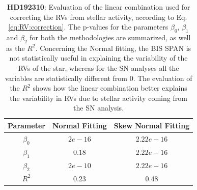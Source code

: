 \documentclass[11pt, oneside]{article}
\begin{document}
%
\begin{table}[!t]
\begin{tabular}{|c|c|c|}
\hline
Parameter          & Normal Fitting         &   Skew Normal Fitting \\
\hline
$\beta_{0}$            &    $2e-16$    & $2.22e-16$ \\
\hline
$\beta_{1}$            &    $0.18$    & $2.22e-16$ \\
\hline
$\beta_{2}$            &     $2e-10$   &  $2.22e-16$ \\
\hline
$R^{2}$      &     $0.23$    &  $0.48$   \\
\hline
\end{tabular}
\caption{\textbf{HD192310}: Evaluation of the linear combination used for correcting the RVs from stellar activity, according to Eq. \ref{eq:RV:correction}. The p-values for the parameters  $\beta_{0}$, $\beta_{1}$ and $\beta_{2}$ for both the methodologies are summarized, as well as the $R^2$. Concerning the Normal fitting, the BIS SPAN is not statistically useful in explaining the variability of the RVs of the star, whereas for the SN analyses all the variables are statistically different from $0$. The evaluation of the $R^2$ shows how the linear combination better explains the variability in RVs due to stellar activity coming from the SN analysis.}
\label{table:Gliese785:test}
\end{table}
\end{document}
